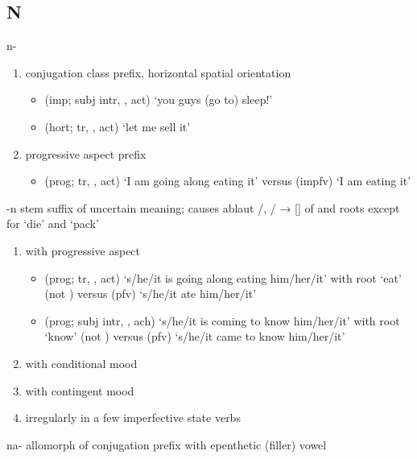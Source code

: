 \subsection{N}\label{sec:alphalist-n}
\begin{morphdesc}[resume*=alphalist]
\item[n-]\label{m:n-}
	\begin{enumerate}
	\item	{} conjugation class prefix, horizontal spatial orientation
		\begin{itemize}
		\item	{} (imp; subj intr, ,  act) ‘you guys (go to) sleep!’
		\item	{} (hort; tr, ,  act) ‘let me sell it’
		\end{itemize}
	\item	progressive aspect prefix
		\begin{itemize}
		\item	{} (prog; tr, , act) ‘I am going along eating it’\newline
			versus  (impfv) ‘I am eating it’
		\end{itemize}
	\end{enumerate}

\item[-n]\label{m:-n}
	stem suffix of uncertain meaning;
	causes ablaut /, / → [] of  and  roots
	except for  ‘die’ and  ‘pack’
	\begin{enumerate}
	\item	with progressive aspect
		\begin{itemize}
		\item	{} (prog; tr, ,  act) ‘s/he/it is going along eating him/her/it’ with root  ‘eat’\newline
			(not )\newline
			versus  (pfv) ‘s/he/it ate him/her/it’
		\item	{} (prog; subj intr, , ach) ‘s/he/it is coming to know him/her/it’ with root  ‘know’\newline
			(not )\newline
			versus  (pfv) ‘s/he/it came to know him/her/it’
		\end{itemize}
	\item	with conditional mood
	\item	with contingent mood
	\item	irregularly in a few imperfective state verbs
	\end{enumerate}

\item[na-]\label{m:na-}
	allomorph of  conjugation prefix  with epenthetic (filler) vowel 
\end{morphdesc}

